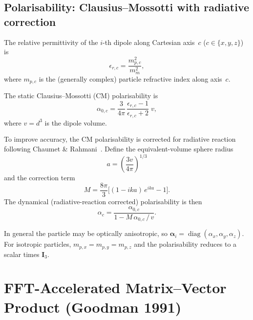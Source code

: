 \documentclass[11pt,a4paper]{article}
\begin{document}
\subsection{Polarisability: Clausius--Mossotti with radiative correction}
\label{sec:polarisability}

The relative permittivity of the $i$-th dipole along Cartesian axis~$c$
($c \in \{x, y, z\}$) is
\begin{equation}
  \epsilon_{r,c} = \frac{m_{p,c}^2}{m_m^2},
  \label{eq:eper-r}
\end{equation}
where $m_{p,c}$ is the (generally complex) particle refractive index along
axis~$c$.

The static Clausius--Mossotti (CM) polarisability is
\begin{equation}
  \alpha_{0,c}
    = \frac{3}{4\pi}\,
      \frac{\epsilon_{r,c} - 1}{\epsilon_{r,c} + 2}\; v,
  \label{eq:cm-polarisability}
\end{equation}
where $v = d^3$ is the dipole volume.

To improve accuracy, the CM polarisability is corrected for radiative
reaction following Chaumet \& Rahmani~\cite{Chaumet2009}.
Define the equivalent-volume sphere radius
\begin{equation}
  a = \left(\frac{3v}{4\pi}\right)^{\!1/3}
  \label{eq:equiv-radius-a}
\end{equation}
and the correction term
\begin{equation}
  M = \frac{8\pi}{3}
      \bigl[(1 - ika)\,e^{ika} - 1\bigr].
  \label{eq:M-term}
\end{equation}
The dynamical (radiative-reaction corrected) polarisability is then
\begin{equation}
  \alpha_c
    = \frac{\alpha_{0,c}}{1 - M\,\alpha_{0,c}\,/\,v}.
  \label{eq:rr-polarisability}
\end{equation}

In general the particle may be optically anisotropic, so
$\boldsymbol{\alpha}_i = \operatorname{diag}(\alpha_x, \alpha_y, \alpha_z)$.
For isotropic particles, $m_{p,x} = m_{p,y} = m_{p,z}$ and the
polarisability reduces to a scalar times $\mathbf{I}_3$.

\section{FFT-Accelerated Matrix--Vector Product (Goodman 1991)}
\label{sec:goodman-fft}
\end{document}
